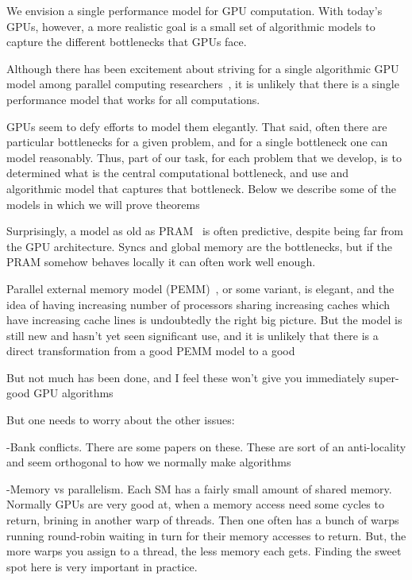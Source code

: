 \begin{rproblem}
We envision a single performance model for GPU computation.  With today's GPUs, however, a more realistic goal is a small set of algorithmic models to capture the different bottlenecks that GPUs face.
\end{rproblem}

Although there has been excitement about striving for a single algorithmic GPU model among parallel computing researchers~\cite{cite-stuff}, it is unlikely that there is a single performance model that works for all computations.

GPUs seem to defy efforts to model them elegantly. 
That said, often there are particular bottlenecks for a given problem, and for a single bottleneck one can model reasonably. 
Thus, part of our task, for each problem that we develop, is to determined what is the central computational bottleneck, and use and algorithmic model that captures that bottleneck.  Below we describe some of the models in which we will prove theorems


Surprisingly, a model as old as PRAM~\cite{cite-PRAM} is often predictive, despite being far from the GPU architecture. Syncs and global memory are the bottlenecks, but if the PRAM somehow behaves locally it can often work well enough.

Parallel external memory model (PEMM)~\cite{cite-PEMM}, or some variant, is elegant, and the idea of having increasing number of processors sharing increasing caches which have increasing cache lines is undoubtedly the right big picture.  But the model is still new and hasn't yet seen significant use, and it is unlikely that there is a direct transformation from a good PEMM model to a good

But not much has been done, and I feel these won't give you immediately super-good GPU algorithms

But one needs to worry about the other issues:

-Bank conflicts. There are some papers on these. These are sort of an anti-locality and seem orthogonal to how we normally make algorithms

-Memory vs parallelism. Each SM has a fairly small amount of shared memory. Normally GPUs are very good at, when a memory access need some cycles to return, brining in another warp of threads. Then one often has a bunch of warps running round-robin waiting in turn for their memory accesses to return. But, the more warps you assign to a thread, the less memory each gets. Finding the sweet spot here is very important in practice.


